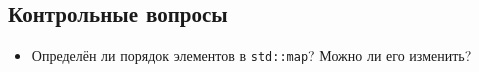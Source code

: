 \documentclass[10pt,twoside,openany]{book}
\begin{document}
\subsection*{Контрольные вопросы}

\begin{itemize}
    \item Определён ли порядок элементов в {\tt std::map}? Можно ли его изменить?
\end{itemize}
\end{document}
